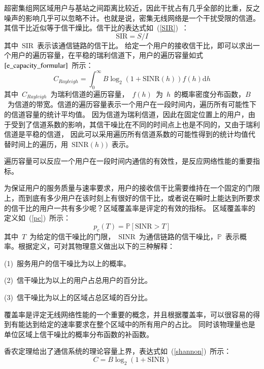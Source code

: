 超密集组网区域用户与基站之间距离比较近，因此干扰占有几乎全部的比重，反之噪声的影响几乎可以忽略不计。也就是说，密集无线网络是一个干扰受限的信道。其信干比近似等于信干燥比。信干比的表达式如~(\ref{SIR})~：
\begin{equation}\label{SIR}
  \mathrm{SIR}=S/I
\end{equation}
其中~$\mathrm{SIR}$~表示该通信链路的信干比。
给定一个用户的接收信干比，即可以求出一个用户的遍历容量，在平稳的瑞利信道下，用户的遍历容量如式~$\ref{e_capacity_formular}$~所示：
\begin{equation}\label{e_capacity_formular}
  C_{Rayleigh} = \int_{0}^{\infty} B \log_2(1+\mathrm{SINR}(h)) f(h) \mathrm{d} h
\end{equation}
其中~$C_{Rayleigh}$~为瑞利信道的遍历容量，~$f(h)$~为~$h$~的概率密度分布函数，$B$~为信道的带宽。信道的遍历容量表示一个用户在一段时间内，遍历所有可能性下的信道容量的统计平均值。
因为信道为瑞利信道，因此在固定位置上的用户，由于受到了信道系数的影响，其信干噪比在不同的时间点上也是不同的，又由于瑞利信道是平稳的信道，
因此可以采用遍历所有信道系数的可能性得到的统计均值代替时间上的遍历，用~$\mathrm{SINR}(h))$~表示。

遍历容量可以反应一个用户在一段时间内通信的有效性，是反应网络性能的重要指标。

为保证用户的服务质量与速率要求，用户的接收信干比需要维持在一个固定的门限上，而到底有多少用户在该时刻上有很好的信干比，或者说在瞬时上能达到所要求的信干比的用户一共有多少呢？区域覆盖率是评定的有效的指标。
区域覆盖率的定义如~(\ref{pc})~所示：
\begin{equation}\label{pc}
  p_c(T) = \mathbb{P}[\mathrm{SINR}>T]
\end{equation}
其中~$T$~为给定的信干噪比的门限，~$\mathrm{SINR}$~为通信链路的信干噪比，$\mathbb{P}$~表示概率。根据定义，可对其物理意义做出以下的三种解释：

 (1)~服务用户的信干噪比为以上的概率。

 (2)~信干噪比为以上的用户占总用户的百分比。

 (3)~信干噪比为以上的区域占总区域的百分比。

覆盖率是评定无线网络性能的一个重要的概念，并且根据覆盖率，可以很容易的得到有能达到给定的速率要求在整个区域中的所有用户的占比。
同时该物理量也是单位区域上信干噪比的概率分布函数的补函数。

香农定理给出了通信系统的理论容量上界，表达式如~(\ref{shannon})~所示：
\begin{equation}\label{shannon}
  C = B \log_2(1+\mathrm{SINR})
\end{equation}

